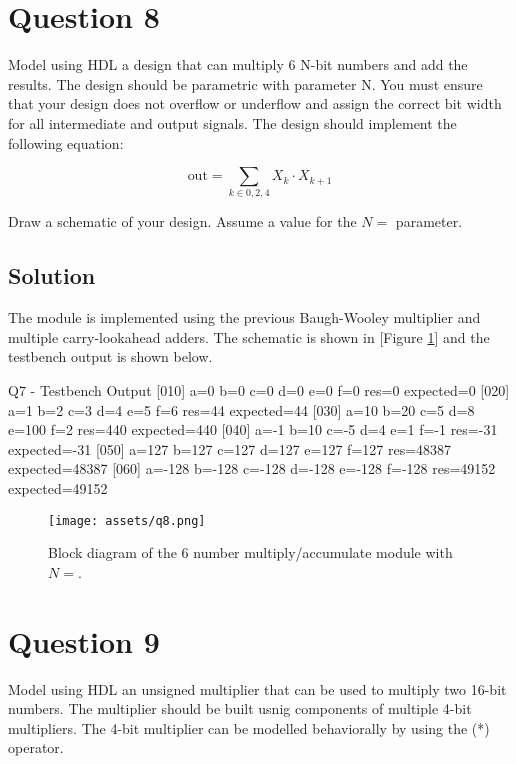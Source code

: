 \documentclass[../main.tex]{subfiles}
\begin{document}
\newpage

\section{Question 8}

Model using HDL a design that can multiply 6 N-bit numbers and add the results. The design should be parametric with parameter N. You must ensure that your design does not overflow or underflow and assign the correct bit width for all intermediate and output signals. The design should implement the following equation:

$$
    \text{out} = \sum_{k \in {0, 2, 4}} X_k \cdot X_{k + 1}
$$

Draw a schematic of your design. Assume a value for the $N = $ parameter.

\subsection*{Solution}

The module is implemented using the previous Baugh-Wooley multiplier and multiple carry-lookahead adders. The schematic is shown in [Figure \ref{q8}] and the testbench output is shown below.

\begin{mintedterminal}{Q7 - Testbench Output}
[010] a=0 b=0 c=0 d=0 e=0 f=0 res=0 expected=0
[020] a=1 b=2 c=3 d=4 e=5 f=6 res=44 expected=44
[030] a=10 b=20 c=5 d=8 e=100 f=2 res=440 expected=440
[040] a=-1 b=10 c=-5 d=4 e=1 f=-1 res=-31 expected=-31
[050] a=127 b=127 c=127 d=127 e=127 f=127 res=48387 expected=48387
[060] a=-128 b=-128 c=-128 d=-128 e=-128 f=-128 res=49152 expected=49152
\end{mintedterminal}

\begin{figure}[h]
    \centering
    \texttt{[image: assets/q8.png]}
    \caption{Block diagram of the 6 number multiply/accumulate module with $N = $.}
    \label{q8}
\end{figure}

\newpage

\section{Question 9}

Model using HDL an unsigned multiplier that can be used to multiply two 16-bit numbers. The multiplier should be built usnig components of multiple 4-bit multipliers. The 4-bit multiplier can be modelled behaviorally by using the (*) operator.
\end{document}
